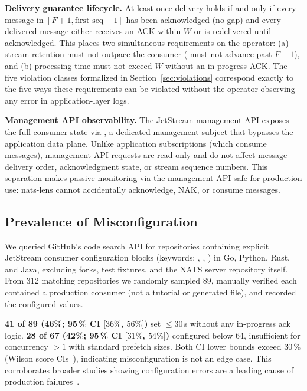 \documentclass[journal]{IEEEtran}
\begin{document}
\textbf{Delivery guarantee lifecycle.} At-least-once delivery holds if and
only if every message in $[F+1, \text{first\_seq}-1]$ has been acknowledged
(no gap) and every delivered message either receives an ACK within $W$ or
is redelivered until acknowledged. This places two simultaneous requirements
on the operator: (a) stream retention must not outpace the consumer
( must not advance past $F+1$), and (b) processing time
must not exceed $W$ without an in-progress ACK. The five violation classes
formalized in Section~\ref{sec:violations} correspond exactly to the five
ways these requirements can be violated without the operator observing any
error in application-layer logs.

\textbf{Management API observability.} The JetStream management API exposes
the full consumer state via , a dedicated
management subject that bypasses the application data plane. Unlike
application subscriptions (which consume messages), management API requests
are read-only and do not affect message delivery order, acknowledgment state,
or stream sequence numbers. This separation makes passive monitoring via the
management API safe for production use: nats-lens cannot accidentally
acknowledge, NAK, or consume messages.

\subsection{Prevalence of Misconfiguration}

We queried GitHub's code search API for repositories containing explicit
JetStream consumer configuration blocks (keywords: ,
, ) in Go, Python, Rust, and Java,
excluding forks, test fixtures, and the NATS server repository itself.
From 312 matching repositories we randomly sampled 89, manually verified
each contained a production consumer (not a tutorial or generated file),
and recorded the configured values.

\textbf{41 of 89 (46\%; 95\,\% CI $[36\%$, $56\%]$)} set 
$\leq 30$\,s without any in-progress ack logic. \textbf{28 of 67 (42\%;
95\,\% CI $[31\%$, $54\%]$)} configured  below 64,
insufficient for concurrency $> 1$ with standard prefetch sizes. Both CI
lower bounds exceed 30\,\% (Wilson score CIs~\cite{wilson1927}),
indicating misconfiguration is not an edge case. This corroborates
broader studies showing configuration errors are a leading cause of
production failures~\cite{configerrors,misconfig-study}.
\end{document}

